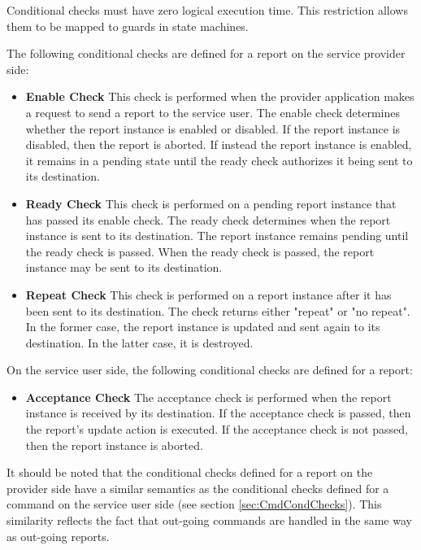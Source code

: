 Conditional checks must have zero logical execution time. This restriction allows them to be mapped to guards in state machines. 

The following conditional checks are defined for a report on the service provider side:

\begin{itemize}
\item \textbf{Enable Check}
This check is performed when the provider application makes a request to send a report to the service user. The enable check determines whether the report instance is enabled or disabled. If the report instance is disabled, then the report is aborted. If instead the report instance is enabled, it remains in a pending state until the ready check authorizes it being sent to its destination.

\item \textbf{Ready Check}
This check is performed on a pending report instance that has passed its enable check. The ready check determines when the report instance is sent to its destination.  The report instance remains pending until the ready check is passed. When the ready check is passed, the report instance may be sent to its destination.  

\item \textbf{Repeat Check}
This check is performed on a report instance after it has been sent to its destination. The check returns either "repeat" or "no repeat". In the former case, the report instance is updated and sent again to its destination. In the latter case, it is destroyed.
\end{itemize}

On the service user side, the following conditional checks are defined for a report:

\begin{itemize}
\item \textbf{Acceptance Check}
The acceptance check is performed when the report instance is received by its destination. If the acceptance check is passed, then the report's update action is executed. If the acceptance check is not passed, then the report instance is aborted.
\end{itemize}

It should be noted that the conditional checks defined for a report on the provider side have a similar semantics as the conditional checks defined for a command on the service user side (see section \ref{sec:CmdCondChecks}). This similarity reflects the fact that out-going commands are handled in the same way as out-going reports.

